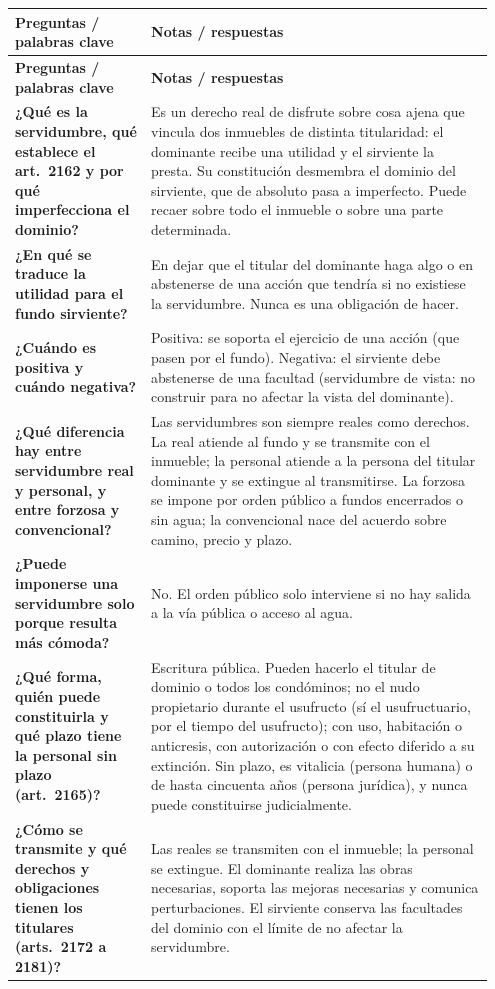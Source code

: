 \documentclass[12pt,oneside]{book}
\makeatletter
\newenvironment{cornell}{%
    \par\vspace{0.5em}
    \noindent
    \begin{longtable}{@{}>{\raggedright\arraybackslash}p{0.27\linewidth}
                         >{\raggedright\arraybackslash}p{0.68\linewidth}@{}}
    \toprule
    \textbf{Preguntas / palabras clave} & \textbf{Notas / respuestas} \\
    \midrule
    \endfirsthead
    \toprule
    \textbf{Preguntas / palabras clave} & \textbf{Notas / respuestas} \\
    \midrule
    \endhead
}{%
    \bottomrule
    \end{longtable}
}
\makeatother
\begin{document}
\begin{cornell}
\textbf{¿Qué es la servidumbre, qué establece el art.~2162 y por qué imperfecciona el dominio?} &
Es un derecho real de disfrute sobre cosa ajena que vincula dos inmuebles de distinta titularidad: el dominante recibe una utilidad y el sirviente la presta. Su constitución desmembra el dominio del sirviente, que de absoluto pasa a imperfecto. Puede recaer sobre todo el inmueble o sobre una parte determinada. \\

\textbf{¿En qué se traduce la utilidad para el fundo sirviente?} &
En dejar que el titular del dominante haga algo o en abstenerse de una acción que tendría si no existiese la servidumbre. Nunca es una obligación de hacer. \\

\textbf{¿Cuándo es positiva y cuándo negativa?} &
Positiva: se soporta el ejercicio de una acción (que pasen por el fundo). Negativa: el sirviente debe abstenerse de una facultad (servidumbre de vista: no construir para no afectar la vista del dominante). \\

\textbf{¿Qué diferencia hay entre servidumbre real y personal, y entre forzosa y convencional?} &
Las servidumbres son siempre reales como derechos. La real atiende al fundo y se transmite con el inmueble; la personal atiende a la persona del titular dominante y se extingue al transmitirse. La forzosa se impone por orden público a fundos encerrados o sin agua; la convencional nace del acuerdo sobre camino, precio y plazo. \\

\textbf{¿Puede imponerse una servidumbre solo porque resulta más cómoda?} &
No. El orden público solo interviene si no hay salida a la vía pública o acceso al agua. \\

\textbf{¿Qué forma, quién puede constituirla y qué plazo tiene la personal sin plazo (art.~2165)?} &
Escritura pública. Pueden hacerlo el titular de dominio o todos los condóminos; no el nudo propietario durante el usufructo (sí el usufructuario, por el tiempo del usufructo); con uso, habitación o anticresis, con autorización o con efecto diferido a su extinción. Sin plazo, es vitalicia (persona humana) o de hasta cincuenta años (persona jurídica), y nunca puede constituirse judicialmente. \\

\textbf{¿Cómo se transmite y qué derechos y obligaciones tienen los titulares (arts.~2172 a 2181)?} &
Las reales se transmiten con el inmueble; la personal se extingue. El dominante realiza las obras necesarias, soporta las mejoras necesarias y comunica perturbaciones. El sirviente conserva las facultades del dominio con el límite de no afectar la servidumbre. \\


\end{cornell}
\end{document}
